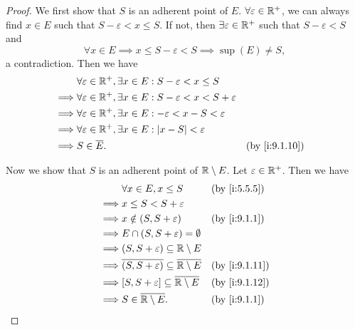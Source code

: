 \begin{proof}
  We first show that \(S\) is an adherent point of \(E\).
  \(\forall \varepsilon \in \mathbb{R}^+\), we can always find \(x \in E\) such that \(S - \varepsilon < x \leq S\).
  If not, then \(\exists \varepsilon \in \mathbb{R}^+\) such that \(S - \varepsilon < S\) and
  \[
    \forall x \in E \implies x \leq S - \varepsilon < S \implies \sup(E) \neq S,
  \]
  a contradiction.
  Then we have
  \begin{align*}
             & \forall \varepsilon \in \R^+, \exists x \in E : S - \varepsilon < x \leq S                               \\
    \implies & \forall \varepsilon \in \R^+, \exists x \in E : S - \varepsilon < x < S + \varepsilon                    \\
    \implies & \forall \varepsilon \in \R^+, \exists x \in E : -\varepsilon < x - S < \varepsilon                       \\
    \implies & \forall \varepsilon \in \R^+, \exists x \in E : \abs{x - S} < \varepsilon                                \\
    \implies & S \in \overline{E}.                                                                   &  & \by{i:9.1.10}
  \end{align*}

  Now we show that \(S\) is an adherent point of \(\mathbb{R} \setminus E\).
  Let \(\varepsilon \in \mathbb{R}^+\).
  Then we have
  \begin{align*}
             & \forall x \in E, x \leq S                                           &  & \by{i:5.5.5}  \\
    \implies & x \leq S < S + \varepsilon                                                             \\
    \implies & x \notin (S, S + \varepsilon)                                       &  & \by{i:9.1.1}  \\
    \implies & E \cap (S, S + \varepsilon) = \emptyset                                                \\
    \implies & (S, S + \varepsilon) \subseteq \R \setminus E                                          \\
    \implies & \overline{(S, S + \varepsilon)} \subseteq \overline{\R \setminus E} &  & \by{i:9.1.11} \\
    \implies & [S, S + \varepsilon] \subseteq \overline{\R \setminus E}            &  & \by{i:9.1.12} \\
    \implies & S \in \overline{\R \setminus E}.                                    &  & \by{i:9.1.1}
  \end{align*}
\end{proof}

